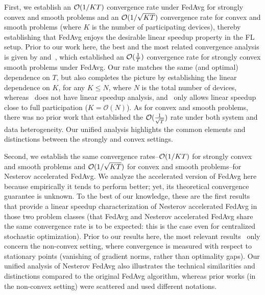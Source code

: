 First, we establish an {\small{${\mathcal{O}}(1/KT)$}} convergence rate  under FedAvg for strongly convex and smooth problems and  an
{\small{${\mathcal{O}}(1/\sqrt{KT})$}} convergence rate for convex
and smooth problems (where $K$ is the number of participating devices), thereby establishing that FedAvg enjoys the desirable linear speedup property in the FL setup. Prior to our work here, the best and the most related convergence analysis is given by \cite{li2019convergence} and~\cite{karimireddy2019scaffold}, which established an ${\mathcal{O}}(\frac{1}{T})$ convergence rate for strongly convex smooth problems under FedAvg. Our rate matches the same (and optimal) dependence on $T$, but also completes the picture by establishing the linear dependence on $K$, for any $K\leq N$, where $N$ is the total number of devices, whereas~\cite{li2019convergence} does not have linear speedup analysis, and~\cite{karimireddy2019scaffold} only allows linear speedup close to full participation ($K=\mathcal{O}(N)$). As for convex and smooth problems, there was no prior work that established the {\small{${\mathcal{O}}(\frac{1}{\sqrt{T}})$}} rate under both system and data heterogeneity. Our unified analysis highlights the common elements and distinctions between the strongly and convex settings.

Second, we establish the same convergence rates--{\small{${\mathcal{O}}(1/KT)$}} for strongly convex and smooth problems and {\small{${\mathcal{O}}(1/\sqrt{KT})$}} for convex and smooth problems--for Nesterov accelerated FedAvg. 
We analyze the accelerated version of FedAvg here because empirically it tends to perform better; yet, its theoretical convergence guarantee is unknown. To the best of our knowledge, these are the first results that provide a linear speedup characterization of Nesterov accelerated FedAvg in those two problem classes (that FedAvg and Nesterov accelerated FedAvg share the same convergence rate is to be expected: this is the case even for centralized stochastic optimization). Prior to our results here, the most relevant results~\cite{yu2019linear,li2018federated,huo2020faster} only concern the non-convex setting, where convergence is measured with respect to stationary points (vanishing of gradient norms, rather than optimality gaps). Our unified analysis of Nesterov FedAvg also illustrates the technical similarities and distinctions compared to the original FedAvg algorithm, whereas prior works (in the non-convex setting) were scattered and used different notations.

